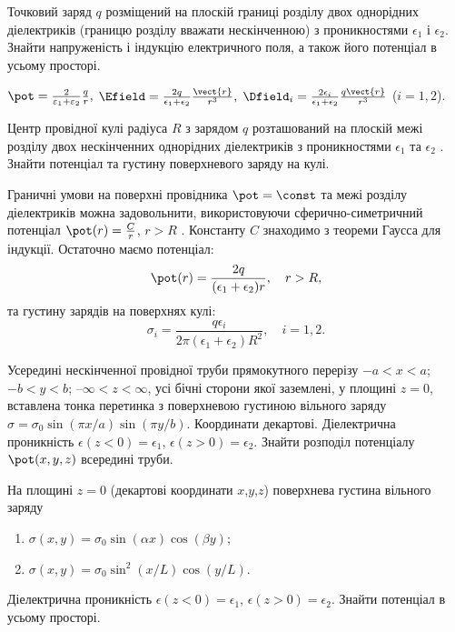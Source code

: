 \begin{problem}
Точковий заряд $q$ розміщений на плоскій границі розділу двох однорідних  діелектриків (границю розділу вважати нескінченною) з проникностями $\epsilon_{1}$ і $\epsilon_{2}$. Знайти напруженість і індукцію електричного поля, а також його потенціал в усьому просторі.
\begin{solution}
	$
		\pot  = \frac{2}{{{\varepsilon _1} + {\varepsilon _2}}}\frac{q}{r},
	$
	$
		\Efield = \frac{2q}{\epsilon_1 + \epsilon_2}\frac{\vect{r}}{r^3},
	$
	$ \Dfield_i = \frac{2\epsilon_i}{\epsilon_1 + \epsilon_2}\frac{q\vect{r}}{r^3} $ ($i = 1,2$).
\end{solution}
\end{problem}


\begin{problem}
Центр провідної кулі радіуса $R$  з зарядом $q$  розташований на плоскій межі розділу двох нескінченних однорідних діелектриків з проникностями $\epsilon_1$ та $\epsilon_2$ . Знайти потенціал та густину поверхневого заряду на кулі.
\begin{solution}
	Граничні умови на поверхні провідника $\pot = \const$  та межі розділу діелектриків можна задовольнити, використовуючи сферично-симетричний потенціал  $\pot(r) = \frac{C}{r}$, $r > R$ . Константу $C$ знаходимо з теореми Гаусса для індукції. Остаточно маємо потенціал:
	\[
		\pot(r) = \frac{2q}{(\epsilon_1 + \epsilon_2)r}, \quad r > R,
	\]
	та густину зарядів на поверхнях кулі:
	\[
		\sigma_i = \frac{q\epsilon_i}{2\pi(\epsilon_1 + \epsilon_2)R^2}, \quad i = 1,2.
	\]
\end{solution}
\end{problem}

\begin{problem}
Усередині нескінченної провідної труби прямокутного перерізу $-a<x<a$; $-b<y<b$; $–\infty<z<\infty$,
усі бічні сторони якої заземлені, у площині $z=0$, вставлена тонка перетинка з поверхневою густиною
вільного заряду $\sigma  = \sigma _0\sin (\pi x/a)\sin (\pi y/b)$. Координати декартові. Діелектрична
проникність  $\epsilon (z < 0) = \epsilon _1$, $\epsilon (z > 0) = \epsilon _2$. Знайти розподіл
потенціалу $\pot(x,y,z)$ всередині труби.
\end{problem}

\begin{problem}
На площині $z=0$ (декартові координати $x$,$y$,$z$) поверхнева густина вільного заряду
\begin{enumerate}[label=\alph*)]
	\item $\sigma (x,y) = \sigma _0\sin (\alpha x)\cos (\beta y)$;
	\item $\sigma (x,y) = {\sigma _0}{\sin ^2}(x/L)\cos (y/L)$.
\end{enumerate}
Діелектрична проникність  $\epsilon (z < 0) = \epsilon _1$, $\epsilon (z > 0) = \epsilon _2$. Знайти потенціал в усьому просторі.
\end{problem}

